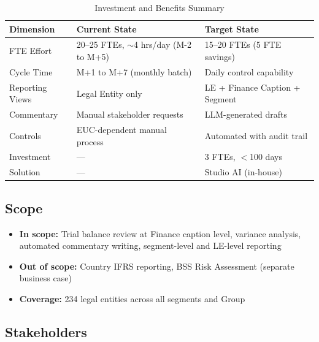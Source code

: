 \documentclass[11pt,a4paper]{article}
\begin{document}
\begin{table}[H]
\centering
\caption{Investment and Benefits Summary}
\begin{tabular}{lll}
\toprule
\textbf{Dimension} & \textbf{Current State} & \textbf{Target State} \\
\midrule
FTE Effort          & 20--25 FTEs, $\sim$4 hrs/day (M-2 to M+5) & 15--20 FTEs (5 FTE savings) \\
Cycle Time          & M+1 to M+7 (monthly batch)                & Daily control capability \\
Reporting Views     & Legal Entity only                          & LE + Finance Caption + Segment \\
Commentary          & Manual stakeholder requests                & LLM-generated drafts \\
Controls            & EUC-dependent manual process               & Automated with audit trail \\
Investment          & ---                                        & 3 FTEs, $<$100 days \\
Solution            & ---                                        & Studio AI (in-house) \\
\bottomrule
\end{tabular}
\end{table}

\subsection{Scope}

\begin{itemize}[nosep]
    \item \textbf{In scope:} Trial balance review at Finance caption level, variance analysis, automated commentary writing, segment-level and LE-level reporting
    \item \textbf{Out of scope:} Country IFRS reporting, BSS Risk Assessment (separate business case)
    \item \textbf{Coverage:} 234 legal entities across all segments and Group
\end{itemize}

\subsection{Stakeholders}
\end{document}
